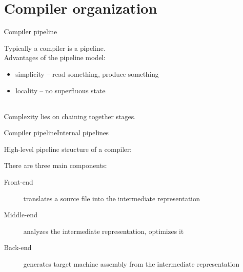 
\section{Compiler organization}


\begin{frame}{Compiler pipeline}
\begin{center}
Typically a compiler is a \alert{pipeline}.\\
\bigskip
Advantages of the pipeline model:\\
\medskip
\begin{varwidth}{0.8\textwidth}
\begin{itemize}
\item \alert{simplicity} -- read something, produce something
\item \alert{locality} -- no superfluous state
\end{itemize}
\end{varwidth}
\\
\bigskip
Complexity lies on \alert{chaining} together stages.
\end{center}
\end{frame}


\begin{frame}{Compiler pipeline}{Internal pipelines}
\begin{center}
High-level pipeline structure of a compiler:\\
\begin{figure}
\centering

\end{figure}
\medskip
There are three main components:

\begin{description}
\item[Front-end] \alert{translates} a source file into the intermediate representation
\item[Middle-end] \alert{analyzes} the intermediate representation, \alert{optimizes}
                  it
\item[Back-end] \alert{generates} target machine assembly from the intermediate
                representation
\end{description}
\end{center}
\end{frame}


